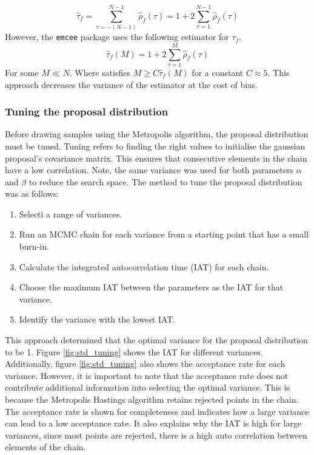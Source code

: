 \documentclass[11pt]{article}
\begin{document}
\begin{equation}
\hat{\tau}_f = \sum_{\tau=-(N-1)}^{N-1} \hat{\rho}_f(\tau) = 1 + 2 \sum_{\tau=1}^{N-1} \hat{\rho}_f(\tau)
\end{equation}
However, the \texttt{emcee} package uses the following estimator for \(\tau_f\). 
\begin{equation}
\hat{\tau}_f(M) = 1 + 2 \sum_{\tau=1}^{M} \hat{\rho}_f(\tau)
\end{equation}
For some \(M \ll N\). Where satisfies \(M \ge C \hat{\tau}_f(M)\) for a constant \(C \approx 5\). This approach decreases the variance of the estimator at the cost of bias.

\subsubsection{Tuning the proposal distribution}
Before drawing samples using the Metropolis algorithm, the proposal distribution must be tuned. Tuning refers to finding the right values to initialise the gaussian proposal's covariance matrix. This ensures that consecutive elements in the chain have a low correlation. Note, the same variance was used for both parameters $\alpha$ and $\beta$ to reduce the search space. The method to tune the proposal distribution was as follows:

\begin{enumerate}
    \item Selecti a range of variances.
    \item Run an MCMC chain for each variance from a starting point that has a small burn-in.
    \item Calculate the integrated autocorrelation time (IAT) for each chain.
    \item Choose the maximum IAT between the parameters as the IAT for that variance.
    \item Identify the variance with the lowest IAT.
\end{enumerate}
This approach determined that the optimal variance for the proposal distribution to be 1. Figure \ref{fig:std_tuning} shows the IAT for different variances. Additionally, figure \ref{fig:std_tuning} also shows the acceptance rate for each variance. However, it is important to note that the acceptance rate does not contribute additional information into selecting the optimal variance. This is because the Metropolis Hastings algorithm  retains rejected points in the chain. The acceptance rate is shown for completeness and indicates how a large variance can lead to a low acceptance rate. It also explains why the IAT is high for large variances, since most points are rejected, there is a high auto correlation between elements of the chain.
\end{document}
